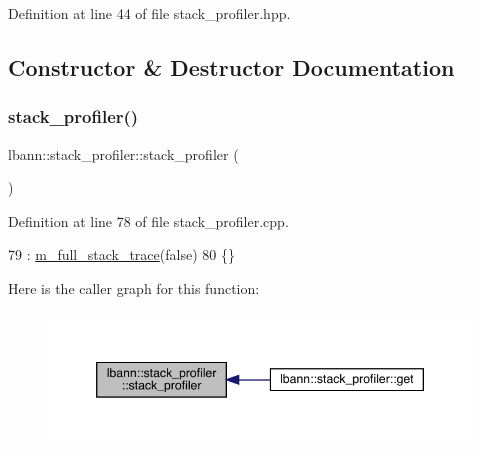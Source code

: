 Definition at line 44 of file stack\+\_\+profiler.\+hpp.



\subsection{Constructor \& Destructor Documentation}
\mbox{\label{classlbann_1_1stack__profiler_aee22d226f565eb88cc877570ca818033}} 
\subsubsection{\texorpdfstring{stack\+\_\+profiler()}{stack\_profiler()}\hspace{0.1cm}{\footnotesize\ttfamily [1/2]}}
{\footnotesize\ttfamily lbann\+::stack\+\_\+profiler\+::stack\+\_\+profiler (\begin{DoxyParamCaption}{ }\end{DoxyParamCaption})\hspace{0.3cm}{\ttfamily [private]}}



Definition at line 78 of file stack\+\_\+profiler.\+cpp.


\begin{DoxyCode}
79   : \hyperlink{classlbann_1_1stack__profiler_a7dd8bf137ea417ecf54537d64c6d296a}{m\_full\_stack\_trace}(\textcolor{keyword}{false})
80   \{\}
\end{DoxyCode}
Here is the caller graph for this function\+:\nopagebreak
\begin{figure}[H]
\begin{center}
\leavevmode
\includegraphics[width=346pt]{classlbann_1_1stack__profiler_aee22d226f565eb88cc877570ca818033_icgraph}
\end{center}
\end{figure}
\mbox{\label{classlbann_1_1stack__profiler_a57329b6f2822f91e6dad13b19bcc81d9}} 
